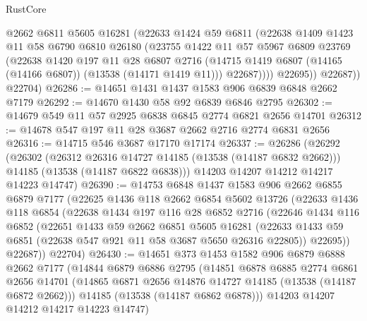 \begin{lexlean}{RustCore}
\begin{coremodule}
              @2662
              @6811
              @5605
              @16281
              (@22633
                @1424
                @59
                @6811
                (@22638
                  @1409
                  @1423
                  @11
                  @58
                  @6790
                  @6810
                  @26180
                  (@23755
                    @1422
                    @11
                    @57
                    @5967
                    @6809
                    @23769
                    (@22638
                      @1420
                      @197
                      @11
                      @28
                      @6807
                      @2716
                      (@14715 @1419 @6807 (@14165 (@14166 @6807)) (@13538 (@14171 @1419 @11)))
                      @22687))))
              @22695))
          @22687))
      @22704)
@26286 := @14651 @1431 @1437 @1583 @906 @6839 @6848 @2662 @7179
@26292 := @14670 @1430 @58 @92 @6839 @6846 @2795
@26302 := @14679 @549 @11 @57 @2925 @6838 @6845 @2774 @6821 @2656 @14701
@26312 := @14678 @547 @197 @11 @28 @3687 @2662 @2716 @2774 @6831 @2656
@26316 := @14715 @546 @3687 @17170 @17174
@26337 := @26286
    (@26292
      (@26302
        (@26312 @26316 @14727 @14185 (@13538 (@14187 @6832 @2662)))
        @14185
        (@13538 (@14187 @6822 @6838)))
      @14203
      @14207
      @14212
      @14217
      @14223
      @14747)
@26390 := @14753
    @6848
    @1437
    @1583
    @906
    @2662
    @6855
    @6879
    @7177
    (@22625
      @1436
      @118
      @2662
      @6854
      @5602
      @13726
      (@22633
        @1436
        @118
        @6854
        (@22638
          @1434
          @197
          @116
          @28
          @6852
          @2716
          (@22646
            @1434
            @116
            @6852
            (@22651
              @1433
              @59
              @2662
              @6851
              @5605
              @16281
              (@22633 @1433 @59 @6851 (@22638 @547 @921 @11 @58 @3687 @5650 @26316 @22805))
              @22695))
          @22687))
      @22704)
@26430 := @14651
    @373
    @1453
    @1582
    @906
    @6879
    @6888
    @2662
    @7177
    (@14844
      @6879
      @6886
      @2795
      (@14851
        @6878
        @6885
        @2774
        @6861
        @2656
        @14701
        (@14865 @6871 @2656 @14876 @14727 @14185 (@13538 (@14187 @6872 @2662)))
        @14185
        (@13538 (@14187 @6862 @6878)))
      @14203
      @14207
      @14212
      @14217
      @14223
      @14747)

\end{coremodule}
\end{lexlean}
